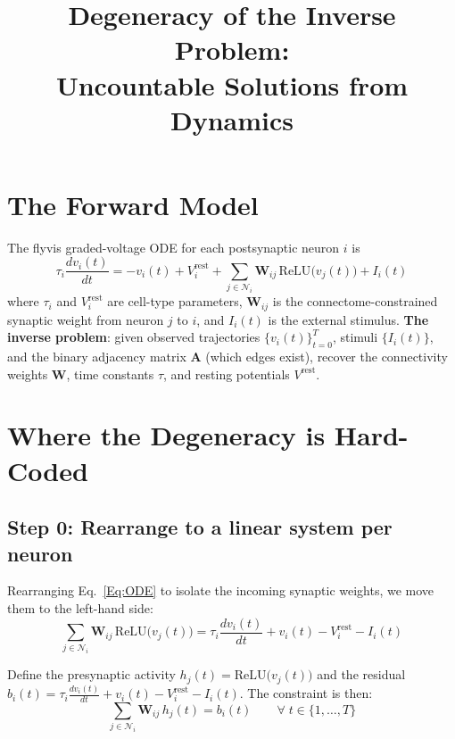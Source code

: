 \documentclass[11pt,a4paper]{article}
\title{Degeneracy of the Inverse Problem:\\Uncountable Solutions from Dynamics}
\date{}
\begin{document}
\maketitle

\section{The Forward Model}

The flyvis graded-voltage ODE for each postsynaptic neuron $i$ is
\begin{equation}
\tau_i\frac{dv_i(t)}{dt} = -v_i(t) + V_i^{\text{rest}}
+ \sum_{j\in\mathcal{N}_i} \mathbf{W}_{ij}\,
  \text{ReLU}\!\big(v_j(t)\big)
+ I_i(t)
\end{equation}
\label{Eq:ODE}
where $\tau_i$ and $V_i^{\mathrm{rest}}$ are cell-type parameters, $\mathbf{W}_{ij}$ is the connectome-constrained synaptic weight from neuron $j$ to $i$, and $I_i(t)$ is the external stimulus. \textbf{The inverse problem}: given observed trajectories $\{v_i(t)\}_{t=0}^{T}$, stimuli $\{I_i(t)\}$, and the binary adjacency matrix $\mathbf{A}$ (which edges exist), recover the connectivity weights $\mathbf{W}$, time constants $\tau$, and resting potentials $V^{\text{rest}}$.

\section{Where the Degeneracy is Hard-Coded}

\subsection{Step 0: Rearrange to a linear system per neuron}

Rearranging Eq.~\ref{Eq:ODE} to isolate the incoming synaptic weights, we move them to the left-hand side:
\begin{equation}
\sum_{j\in\mathcal{N}_i} \mathbf{W}_{ij}\, \text{ReLU}\!\big(v_j(t)\big) = \tau_i \frac{dv_i(t)}{dt} + v_i(t) - V_i^{\text{rest}} - I_i(t)
\end{equation}

Define the presynaptic activity $h_j(t) = \text{ReLU}\!\big(v_j(t)\big)$ and the residual $b_i(t) = \tau_i \frac{dv_i(t)}{dt} + v_i(t) - V_i^{\text{rest}} - I_i(t)$. The constraint is then:
\begin{equation}
\sum_{j \in \mathcal{N}_i} \mathbf{W}_{ij}\, h_j(t) = b_i(t) \qquad \forall\; t \in \{1, \dots, T\}
\end{equation}
\end{document}
